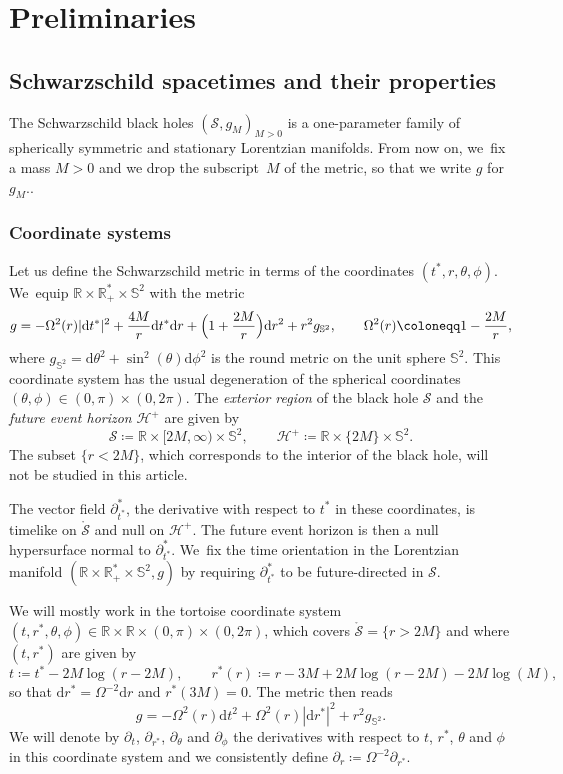 \documentclass[JEP,XML,SOM,Unicode,published]{cedram}
\theoremstyle{plain}
\theoremstyle{definition}
\newcommand\R{{\mathbb{R}}}
\newcommand\dr{{\mathrm{d}}}
\begin{document}
\section{Preliminaries}\label{Sec2}

\subsection{Schwarzschild spacetimes and their properties}

The Schwarzschild black holes $(\mathcal{S},g_M)_{M>0}$ is a one-parameter family of spherically symmetric and stationary Lorentzian manifolds. From now on, we~fix a mass $M>0$ and we drop the subscript~$M$ of the metric, so that we write $g$ for $g_M$..

\subsubsection{Coordinate systems}

Let us define the Schwarzschild metric in terms of the coordinates $(t^*,r,\theta,\phi)$. We~equip $\R \times \R_+^* \times \mathbb{S}^2$ with the metric
\[
g=-\Omega^2(r) |\dr t^*|^2+\frac{4M}{r} \dr t^* \dr r+\Bigl(1+\frac{2M}{r}\Bigr)\dr r^2+r^2g_{\mathbb{S}^2},\qquad \Omega^2(r)\coloneqq1-\frac{2M}{r},
\]
where $g_{ \mathbb{S}^2} = \dr \theta^2+\sin^2(\theta) \dr\phi^2$ is the round metric on the unit sphere $\mathbb{S}^2$. This coordinate system has the usual degeneration of the spherical coordinates $(\theta, \phi) \in (0,\pi) \times (0,2\pi)$. The \textit{exterior region} of the black hole $\mathcal{S}$ and the \textit{future event horizon} $\mathcal{H}^+$ are given by
\[
\mathcal{S} \coloneqq \R \times [2M,\infty) \times \mathbb{S}^2,\qquad \mathcal{H}^+ \coloneqq \R \times \{2M\} \times \mathbb{S}^2.
\]
The subset $\{ r < 2M \}$, which corresponds to the interior of the black hole, will not be studied in this article.

The vector field $\partial^*_{t^*}$, the derivative with respect to $t^*$ in these coordinates, is timelike on $\mathring{\mathcal{S}}$ and null on $\mathcal{H}^+$. The future event horizon is then a null hypersurface normal to $\partial^*_{t^*}$. We~fix the time orientation in the Lorentzian manifold $(\R \times \R_+^* \times \mathbb{S}^2,g)$ by requiring $\partial^*_{t^*}$ to be future-directed in $\mathcal{S}$.

We will mostly work in the tortoise coordinate system $(t,r^*,\theta, \phi) \in \R \times \R \times (0,\pi)\times (0,2\pi)$, which covers $\mathring{\mathcal{S}} = \{ r >2M \}$ and where $(t,r^*)$ are given by
\[
t \coloneqq t^*-2M\log (r-2M),\qquad r^*(r)\coloneqq r-3M+2M\log (r-2M)-2M \log(M),
\]
so that $\dr r^*= \Omega^{-2} \dr r$ and $r^*(3M)=0$. The metric then reads
\begin{equation}\label{eq:defmetric}
g=-\Omega^2(r)\mathrm{d} t^2+\Omega^2(r)|\mathrm{d} r^*|^2+r^2 g_{\mathbb{S}^2}.
\end{equation}
We will denote by $\partial_t$, $\partial_{r^*}$, $\partial_\theta$ and $\partial_\phi$ the derivatives with respect to $t$, $r^*$, $\theta$ and $\phi$ in this coordinate system and we consistently define $\partial_r \coloneqq \Omega^{-2} \partial_{r^*}$.
\end{document}
